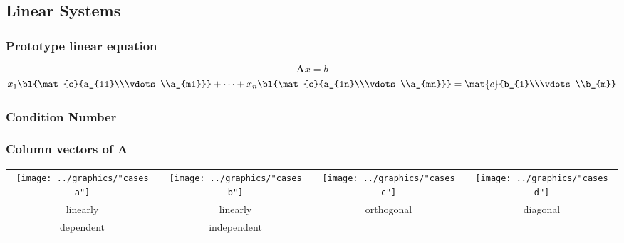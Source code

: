 \documentclass[handout]{beamer}
\begin{document}
\subsection{Linear Systems}
 
\begin{frame}      %
\frametitle{Prototype linear equation}
  {\Huge{$$\mathbf{A}x=b$$}}
  $$x_{1} \bl{\mat{c}{a_{11}\\\vdots\\a_{m1}}}+\dots+
    x_{n} \bl{\mat{c}{a_{1n}\\\vdots\\a_{mn}}} = \mat{c}{b_{1}\\\vdots\\b_{m}}$$
\end{frame}

\begin{frame}
  \frametitle{Condition Number}  %
\end{frame}


\begin{frame}      %
\frametitle{Column vectors of $\mathbf{A}$}
  \begin{table}[htdp]
    \begin{center}
      \begin{tabular}{cccc}
        \texttt{[image: ../graphics/"cases a"]} & 
        \texttt{[image: ../graphics/"cases b"]} & 
        \texttt{[image: ../graphics/"cases c"]} & 
        \texttt{[image: ../graphics/"cases d"]} \\ 
        linearly & linearly  & orthogonal & diagonal \\
        dependent & independent
      \end{tabular}
    \end{center}
  \end{table}%
\end{frame}
\end{document}
